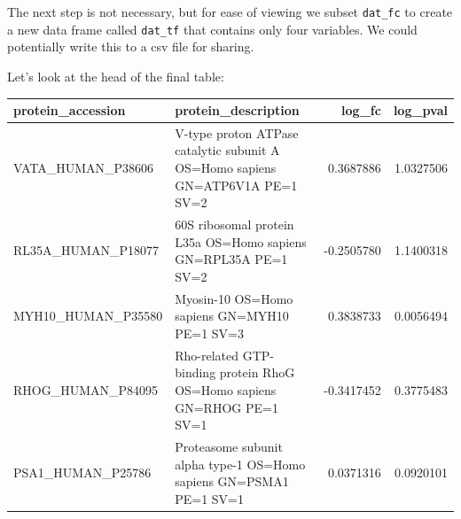 \documentclass[12pt,]{book}
\newenvironment{Shaded}{\begin{snugshade}}{\end{snugshade}}
\newcommand{\KeywordTok}[1]{\textcolor[rgb]{0.13,0.29,0.53}{\textbf{#1}}}
\newcommand{\DataTypeTok}[1]{\textcolor[rgb]{0.13,0.29,0.53}{#1}}
\newcommand{\DecValTok}[1]{\textcolor[rgb]{0.00,0.00,0.81}{#1}}
\newcommand{\StringTok}[1]{\textcolor[rgb]{0.31,0.60,0.02}{#1}}
\newcommand{\CommentTok}[1]{\textcolor[rgb]{0.56,0.35,0.01}{\textit{#1}}}
\newcommand{\OperatorTok}[1]{\textcolor[rgb]{0.81,0.36,0.00}{\textbf{#1}}}
\newcommand{\NormalTok}[1]{#1}
\theoremstyle{definition}
\theoremstyle{definition}
\theoremstyle{definition}
\theoremstyle{remark}
\begin{document}
\begin{Shaded}
\end{Shaded}

The next step is not necessary, but for ease of viewing we subset
\texttt{dat\_fc} to create a new data frame called \texttt{dat\_tf} that
contains only four variables. We could potentially write this to a csv
file for sharing.

\begin{Shaded}
\end{Shaded}

Let's look at the head of the final table:

\begin{tabular}{llrr}
\toprule
protein\_accession & protein\_description & log\_fc & log\_pval\\
\midrule
VATA\_HUMAN\_P38606 & V-type proton ATPase catalytic subunit A OS=Homo sapiens GN=ATP6V1A PE=1 SV=2 & 0.3687886 & 1.0327506\\
RL35A\_HUMAN\_P18077 & 60S ribosomal protein L35a OS=Homo sapiens GN=RPL35A PE=1 SV=2 & -0.2505780 & 1.1400318\\
MYH10\_HUMAN\_P35580 & Myosin-10 OS=Homo sapiens GN=MYH10 PE=1 SV=3 & 0.3838733 & 0.0056494\\
RHOG\_HUMAN\_P84095 & Rho-related GTP-binding protein RhoG OS=Homo sapiens GN=RHOG PE=1 SV=1 & -0.3417452 & 0.3775483\\
PSA1\_HUMAN\_P25786 & Proteasome subunit alpha type-1 OS=Homo sapiens GN=PSMA1 PE=1 SV=1 & 0.0371316 & 0.0920101\\
\bottomrule
\end{tabular}
\end{document}
